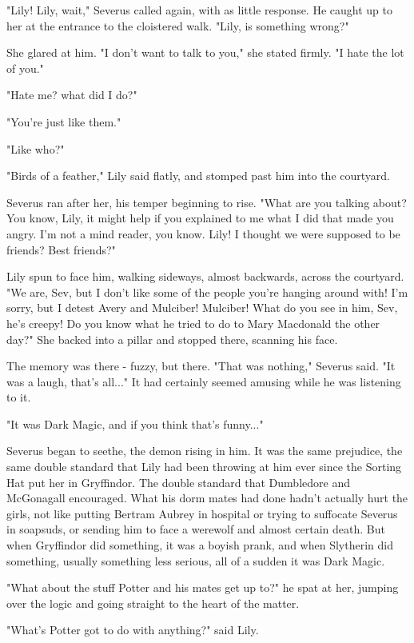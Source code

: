 \documentclass[a4paper,11pt]{article}
\begin{document}
"Lily! Lily, wait," Severus called again, with as little response. He caught up to her at the entrance to the cloistered walk. "Lily, is something wrong?"

She glared at him. "I don't want to talk to you," she stated firmly. "I hate the lot of you."

"Hate me? what did I do?"

"You're just like them."

"Like who?"

"Birds of a feather," Lily said flatly, and stomped past him into the courtyard.

Severus ran after her, his temper beginning to rise. "What are you talking about? You know, Lily, it might help if you explained to me what I did that made you angry. I'm not a mind reader, you know. Lily! I thought we were supposed to be friends? Best friends?"

Lily spun to face him, walking sideways, almost backwards, across the courtyard. "We are, Sev, but I don't like some of the people you're hanging around with! I'm sorry, but I detest Avery and Mulciber! Mulciber! What do you see in him, Sev, he's creepy! Do you know what he tried to do to Mary Macdonald the other day?" She backed into a pillar and stopped there, scanning his face.

The memory was there - fuzzy, but there. "That was nothing," Severus said. "It was a laugh, that's all..." It had certainly seemed amusing while he was listening to it.

"It was Dark Magic, and if you think that's funny..."

Severus began to seethe, the demon rising in him. It was the same prejudice, the same double standard that Lily had been throwing at him ever since the Sorting Hat put her in Gryffindor. The double standard that Dumbledore and McGonagall encouraged. What his dorm mates had done hadn't actually hurt the girls, not like putting Bertram Aubrey in hospital or trying to suffocate Severus in soapsuds, or sending him to face a werewolf and almost certain death. But when Gryffindor did something, it was a boyish prank, and when Slytherin did something, usually something less serious, all of a sudden it was Dark Magic.

"What about the stuff Potter and his mates get up to?" he spat at her, jumping over the logic and going straight to the heart of the matter.

"What's Potter got to do with anything?" said Lily.
\end{document}

